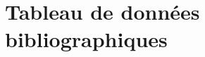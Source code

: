 \clearpage
\section{Tableau de données bibliographiques}
\label{sec:bibliodata}


\begin{table}
\centering
\caption{Références et données utilisés}
\label{table:bibliodata}
\end{table}
